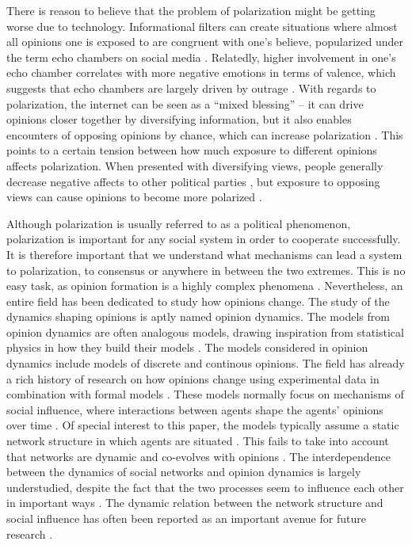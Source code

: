 \documentclass{article}
\begin{document}
There is reason to believe that the problem of polarization might be getting worse due to technology. Informational filters can create situations where almost all opinions one is exposed to are congruent with one’s believe, popularized under the term echo chambers on social media \cite{baumann_modeling_2020, sasahara_social_2021, tsai_echo_2020}. Relatedly, higher involvement in one’s echo chamber correlates with more negative emotions in terms of valence, which suggests that echo chambers are largely driven by outrage \cite{del_vicario_echo_2016}. With regards to polarization, the internet can be seen as a “mixed blessing” – it can drive opinions closer together by diversifying information, but it also enables encounters of opposing opinions by chance, which can increase polarization \cite{lev-on_happy_2009}. This points to a certain tension between how much exposure to different opinions affects polarization. When presented with diversifying views, people generally decrease negative affects to other political parties \cite{levy_social_2021}, but exposure to opposing views can cause opinions to become more polarized \cite{bail_exposure_2018}. 

Although polarization is usually referred to as a political phenomenon, polarization is important for any social system in order to cooperate successfully. It is therefore important that we understand what mechanisms can lead a system to polarization, to consensus or anywhere in between the two extremes. This is no easy task, as opinion formation is a highly complex phenomena \cite{baumann_modeling_2021}. 
Nevertheless, an entire field has been dedicated to study how opinions change. The study of the dynamics shaping opinions is aptly named opinion dynamics. The models from opinion dynamics are often analogous models, drawing inspiration from statistical physics in how they build their models \cite{galesic_integrating_2021}. The models considered in opinion dynamics include models of discrete and continous opinions. The field has already a rich history of research on how opinions change using experimental data in combination with formal models \cite{baumann_modeling_2021,chacoma_opinion_2015,flache_models_2017,friedkin_social_1990,noorazar_classical_2020,spears_social_2021,turner_paths_2018}. These models normally focus on mechanisms of social influence, where interactions between agents shape the agents’ opinions over time \cite{flache_models_2017}. Of special interest to this paper, the models typically assume a static network structure in which agents are situated \cite{galesic_integrating_2021}. This fails to take into account that networks are dynamic and co-evolves with opinions \cite{ferraz_de_arruda_modelling_2022,galesic_integrating_2021}. The interdependence between the dynamics of social networks and opinion dynamics is largely understudied, despite the fact that the two processes seem to influence each other in important ways \cite{asikainen_cumulative_2020,bruch_agent-based_2015,galesic_integrating_2021,kossinets_origins_2009,noorazar_classical_2020}. The dynamic relation between the network structure and social influence has often been reported as an important avenue for future research \cite{flache_models_2017,galesic_integrating_2021}. 
\end{document}
